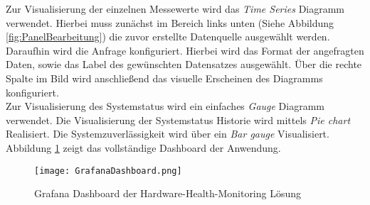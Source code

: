 \vspace{-1.8cm}
Zur Visualisierung der einzelnen Messewerte wird das \textit{Time Series} Diagramm verwendet. Hierbei muss zunächst im Bereich links unten (Siehe Abbildung \ref{fig:PanelBearbeitung}) die zuvor erstellte Datenquelle ausgewählt werden. Daraufhin wird die Anfrage konfiguriert. Hierbei wird das Format der angefragten Daten, sowie das Label des gewünschten Datensatzes ausgewählt. Über die rechte Spalte im Bild wird anschließend das visuelle Erscheinen des Diagramms konfiguriert.\\
Zur Visualisierung des Systemstatus wird ein einfaches \textit{Gauge} Diagramm verwendet. Die Visualisierung der Systemstatus Historie wird mittels \textit{Pie chart} Realisiert. Die Systemzuverlässigkeit wird über ein \textit{Bar gauge} Visualisiert.\\
Abbildung \ref{fig:Grafa} zeigt das vollständige Dashboard der Anwendung.
\vspace{-2cm}
\begin{center}
    \begin{figure}[h!]
        \centering
        \texttt{[image: GrafanaDashboard.png]}
        \caption{Grafana Dashboard der Hardware-Health-Monitoring Lösung}
        \label{fig:Grafa}
    \end{figure}
\end{center}